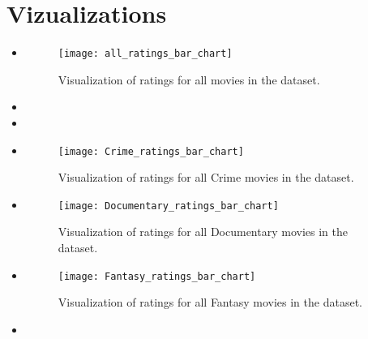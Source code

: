 \section{Vizualizations}
\medskip
\begin{itemize}

    \pagebreak
    \item {}

    \begin{figure}[H]
    \centering
    \texttt{[image: all\_ratings\_bar\_chart]}
    \caption{Visualization of ratings for all movies in the dataset.}
    \end{figure}


    \pagebreak
    \item {}


    \pagebreak
    \item {}


    \pagebreak
    \item {}

    \begin{figure}[H]
    \centering
    \texttt{[image: Crime\_ratings\_bar\_chart]}
    \caption{Visualization of ratings for all Crime movies in the dataset.}
    \end{figure}

    \pagebreak
    \item {}

    \begin{figure}[H]
    \centering
    \texttt{[image: Documentary\_ratings\_bar\_chart]}
    \caption{Visualization of ratings for all Documentary movies in the dataset.}
    \end{figure}


    \pagebreak
    \item {}

    \begin{figure}[H]
    \centering
    \texttt{[image: Fantasy\_ratings\_bar\_chart]}
    \caption{Visualization of ratings for all Fantasy movies in the dataset.}
    \end{figure}


    \pagebreak
    \item {}




\end{itemize}








